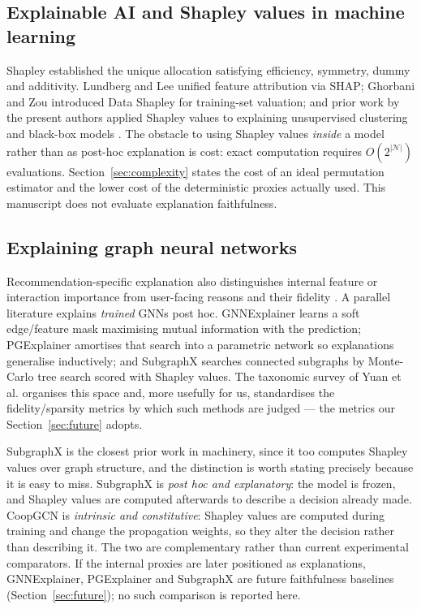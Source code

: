 \documentclass[a4paper,fleqn,longmktitle]{cas-dc}
\begin{document}
\subsection{Explainable AI and Shapley values in machine learning}
\label{sec:rw-xai}

Shapley \citep{shapley1953value} established the unique allocation satisfying
efficiency, symmetry, dummy and additivity. Lundberg and Lee
\citep{lundberg2017shap} unified feature attribution via SHAP; Ghorbani and
Zou \citep{ghorbani2019datashapley} introduced Data Shapley for training-set
valuation; and prior work by the present authors applied Shapley values to
explaining unsupervised clustering and black-box models
\citep{louhichi2023shapley}. The obstacle to using Shapley values \emph{inside}
a model rather than as post-hoc explanation is cost: exact computation
requires $O(2^{|\mathcal{N}|})$ evaluations. Section~\ref{sec:complexity}
states the cost of an ideal permutation estimator and the lower cost of the
deterministic proxies actually used. This manuscript does not evaluate
explanation faithfulness.

\subsection{Explaining graph neural networks}
\label{sec:rw-gnnxai}

Recommendation-specific explanation also distinguishes internal feature or
interaction importance from user-facing reasons and their fidelity
\citep{zhang2020explainable}. A parallel literature explains \emph{trained}
GNNs post hoc. GNNExplainer
\citep{ying2019gnnexplainer} learns a soft edge/feature mask maximising mutual
information with the prediction; PGExplainer \citep{luo2020pgexplainer}
amortises that search into a parametric network so explanations generalise
inductively; and SubgraphX \citep{yuan2021subgraphx} searches connected
subgraphs by Monte-Carlo tree search scored with Shapley values. The taxonomic
survey of Yuan et al. \citep{yuan2023taxonomic} organises this space and, more
usefully for us, standardises the fidelity/sparsity metrics by which such
methods are judged --- the metrics our Section~\ref{sec:future} adopts.

SubgraphX is the closest prior work in machinery, since it too computes
Shapley values over graph structure, and the distinction is worth stating
precisely because it is easy to miss. SubgraphX is \emph{post hoc and
explanatory}: the model is frozen, and Shapley values are computed afterwards
to describe a decision already made. CoopGCN is \emph{intrinsic and
constitutive}: Shapley values are computed during training and change the
propagation weights, so they alter the decision rather than describing it.
The two are complementary rather than current experimental comparators. If the
internal proxies are later positioned as explanations, GNNExplainer,
PGExplainer and SubgraphX are future faithfulness baselines
(Section~\ref{sec:future}); no such comparison is reported here.
\end{document}
